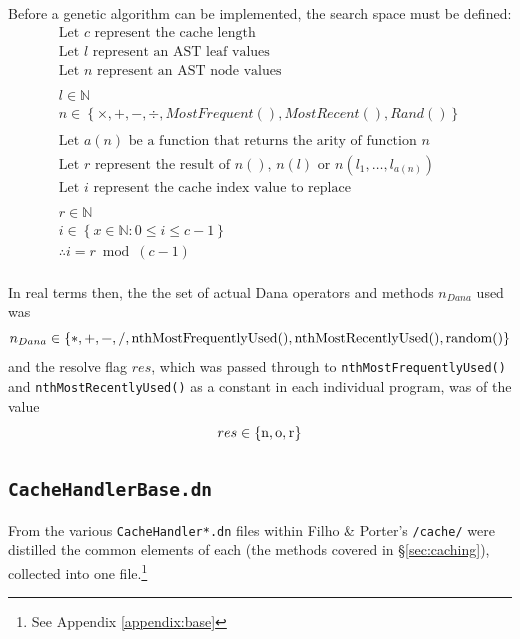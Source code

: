 \documentclass[compsoc,12pt,a4paper]{IEEEtran}
\begin{document}
			Before a genetic algorithm can be implemented, the search space must be defined:
			\begin{gather*}
				 \text{Let }c\text{ represent the cache length} \\
				 \text{Let }l\text{ represent an AST leaf values} \\
				 \text{Let }n\text{ represent an AST node values} \\\\
				 l \in \mathbb{N} \\
				 n \in \left\{\times, +, -, \div, MostFrequent\left(\right), MostRecent\left(\right), Rand\left(\right) \right\} \\\\
				 \text{Let }a\left(n\right)\text{ be a function that returns the arity of function }n \\
				 \text{Let }r\text{ represent the result of }n\left(\right)\text{, }n\left(l\right)\text{ or }n\left(l_1, \dots, l_{a\left(n\right)}\right) \\
				 \text{Let }i\text{ represent the cache index value to replace} \\\\
				 r\in \mathbb{N} \\
				 i \in \left\{x \in \mathbb{N} : 0 \leq i \leq c-1\right\} \\
				 \therefore i = r \bmod{\left(c-1\right)}
			\end{gather*}\\
			In real terms then, the the set of actual Dana operators and methods $n_{Dana}$ used was
			\[ n_{Dana} \in \left\{\text{\lstinline|*|}, \text{\lstinline|+|}, \text{\lstinline|-|}, \text{\lstinline|/|}, \text{\lstinline|nthMostFrequentlyUsed()|}, \text{\lstinline|nthMostRecentlyUsed()|}, \text{\lstinline|random()|}\right\} \]
			and the resolve flag $res$, which was passed through to \lstinline|nthMostFrequentlyUsed()| and \lstinline|nthMostRecentlyUsed()| as a constant in each individual program, was of the value
			\[res \in \left\{\text{\lstinline|n|}, \text{\lstinline|o|}, \text{\lstinline|r|}\right\}\]
			
		\subsection{\lstinline|CacheHandlerBase.dn|}
			
			From the various \lstinline|CacheHandler*.dn| files within Filho \& Porter's \lstinline|/cache/| were distilled the common elements of each (the methods covered in \S \ref{sec:caching}), collected into one file.\footnote{See Appendix \ref{appendix:base}} 
\end{document}
